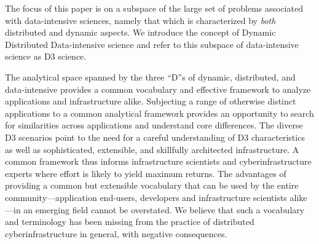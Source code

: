 The focus of this paper is on a subspace of the large set of problems associated
with data-intensive sciences, namely that which is characterized by {\it both}
distributed and dynamic aspects. We introduce the concept of Dynamic Distributed
Data-intensive science and refer to this subspace of data-intensive science as
D3 science.


The analytical space spanned by the three ``D''s of dynamic, distributed,
and data-intensive provides a common vocabulary and effective framework to analyze
applications and infrastructure alike.  Subjecting a range of otherwise distinct
applications to a common analytical framework provides an opportunity to search
for similarities across applications and understand core differences.  The
diverse D3 scenarios point to the need for a careful understanding of D3
characteristics as well as sophisticated, extensible, and skillfully architected
infrastructure.  A common framework thus informs infrastructure scientists and
cyberinfrastructure experts where effort is likely to yield maximum returns.
The advantages of providing a common but extensible vocabulary that can be used
by the entire community---application end-users, developers and infrastructure
scientists alike---in an emerging field cannot be overstated. We believe that
such a vocabulary and terminology has been missing from the practice of
distributed cyberinfrastructure in general, with negative consequences.









